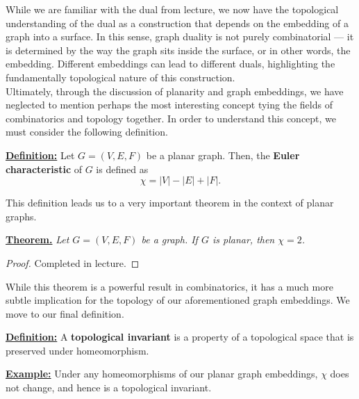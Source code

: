\documentclass{article}
\begin{document}
\noindent While we are familiar with the dual from lecture, we now have the topological understanding of the dual as a construction that depends on the embedding of a graph into a surface. In this sense, graph duality is not purely combinatorial — it is determined by the way the graph sits inside the surface, or in other words, the embedding. Different embeddings can lead to different duals, highlighting the fundamentally topological nature of this construction.\\

\noindent Ultimately, through the discussion of planarity and graph embeddings, we have neglected to mention perhaps the most interesting concept tying the fields of combinatorics and topology together. In order to understand this concept, we must consider the following definition.\\

\begin{graybox}
\noindent\underline{\textbf{Definition:}} Let $G = (V,E,F)$ be a planar graph. Then, the \textbf{Euler characteristic} of $G$ is defined as
\[\chi = |V| - |E| + |F|.\]
\end{graybox}

\noindent This definition leads us to a very important theorem in the context of planar graphs.\\

\begin{bluebox}
\noindent\underline{\textbf{Theorem.}} \textit{Let $G = (V,E,F)$ be a graph. If $G$ is planar, then $\chi = 2$.}
\end{bluebox}
\begin{proof}
    Completed in lecture.
\end{proof}

\noindent While this theorem is a powerful result in combinatorics, it has a much more subtle implication for the topology of our aforementioned graph embeddings. We move to our final definition.\\

\begin{graybox}
\noindent\underline{\textbf{Definition:}} A \textbf{topological invariant} is a property of a topological space that is preserved under homeomorphism.
\end{graybox}

\noindent\underline{\textbf{Example:}} Under any homeomorphisms of our planar graph embeddings, $\chi$ does not change, and hence is a topological invariant.

\pagebreak
\end{document}
